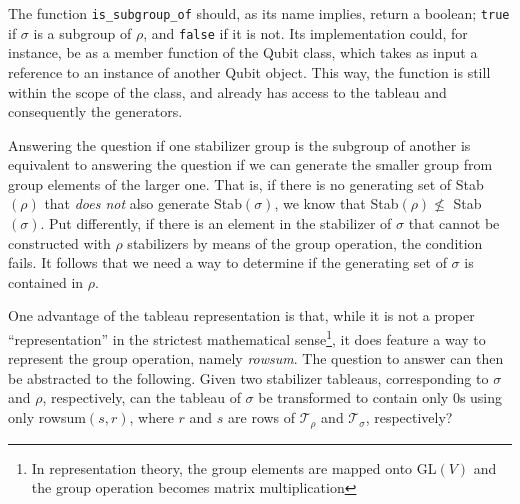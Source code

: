 The function \verb|is_subgroup_of| should, as its name implies, return a
boolean; \verb|true| if $\sigma$ is a subgroup of $\rho$, and \verb|false| if
it is not. Its implementation could, for instance, be as a member function of
the Qubit class, which takes as input a reference to an instance of another Qubit
object. This way, the function is still within the scope of the class,
and already has access to the tableau and consequently the generators. 

Answering the question if one stabilizer group is the subgroup of another is
equivalent to answering the question if we can generate the smaller group from
group elements of the larger one. That is, if there is no generating set of
Stab$(\rho)$ that \emph{does not} also generate Stab$(\sigma)$, we know that
Stab$(\rho)\not\leq$ Stab$(\sigma)$. Put differently, if there is an element in
the stabilizer of $\sigma$ that cannot be constructed with $\rho$ stabilizers
by means of the group operation, the condition fails.
It follows that we need a way to determine if the generating set of $\sigma$ is
contained in $\rho$.

One advantage of the tableau representation is that, while it is not a proper
\enquote{representation} in the strictest mathematical sense\footnote{In
representation theory, the group elements are mapped onto GL$(V)$ and the group
operation becomes matrix multiplication}, it does feature a way to represent
the group operation, namely \emph{rowsum}. The question to answer can then be
abstracted to the following. Given two stabilizer tableaus, corresponding to
$\sigma$ and $\rho$, respectively, can the tableau of $\sigma$ be transformed
to contain only $0$s using only rowsum$(s,r)$, where $r$ and $s$ are rows of
$\mathcal{T}_\rho$ and $\mathcal{T}_\sigma$, respectively?

